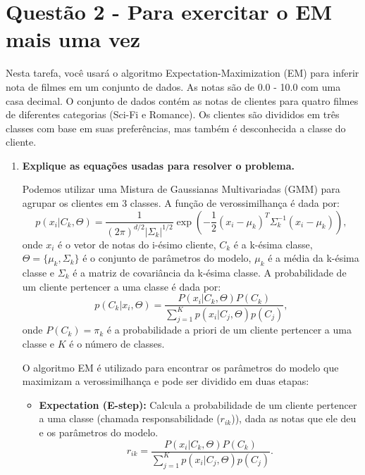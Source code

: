 \section*{Questão 2 - Para exercitar o EM mais uma vez}

Nesta tarefa, você usará o algoritmo Expectation-Maximization (EM) para inferir nota de filmes em um conjunto de dados. As notas são de 0.0 - 10.0 com uma casa decimal. O conjunto de dados contém as notas de clientes para quatro filmes de diferentes categorias (Sci-Fi e Romance). Os clientes são divididos em três classes com base em suas preferências, mas também é desconhecida a classe do cliente.

\begin{enumerate}
    \item \textbf{Explique as equações usadas para resolver o problema.}
    \begin{tcolorbox}[title=Resposta:]
        Podemos utilizar uma Mistura de Gaussianas Multivariadas (GMM) para agrupar os clientes em 3 classes. A função de verossimilhança é dada por:
        \begin{equation}
            p(x_i | C_k, \Theta) = \frac{1}{(2\pi)^{d/2}|\Sigma_k|^{1/2}} \exp\left(-\frac{1}{2}(x_i - \mu_k)^T\Sigma_k^{-1}(x_i - \mu_k)\right),
        \end{equation}
    onde $x_i$ é o vetor de notas do i-ésimo cliente, $C_k$ é a k-ésima classe, $\Theta = \{\mu_k, \Sigma_k\}$ é o conjunto de parâmetros do modelo, $\mu_k$ é a média da k-ésima classe e $\Sigma_k$ é a matriz de covariância da k-ésima classe. A probabilidade de um cliente pertencer a uma classe é dada por:
    \begin{equation}
        p(C_k | x_i, \Theta) = \frac{P(x_i | C_k, \Theta)P(C_k)}{\sum_{j=1}^{K}p(x_i | C_j, \Theta)p(C_j)},
    \end{equation}
    onde $P(C_k)=\pi_k$ é a probabilidade a priori de um cliente pertencer a uma classe e $K$ é o número de classes.
    
    O algoritmo EM é utilizado para encontrar os parâmetros do modelo que maximizam a verossimilhança e pode ser dividido em duas etapas:
    \begin{itemize}
        \item \textbf{Expectation (E-step):} Calcula a probabilidade de um cliente pertencer a uma classe (chamada responsabilidade ($r_{ik}$)), dada as notas que ele deu e os parâmetros do modelo.
        \begin{equation}
            r_{ik} = \frac{P(x_i | C_k, \Theta)P(C_k)}{\sum_{j=1}^{K}p(x_i | C_j, \Theta)p(C_j)}.
        \end{equation}


\end{itemize}
\end{tcolorbox}
\end{enumerate}
